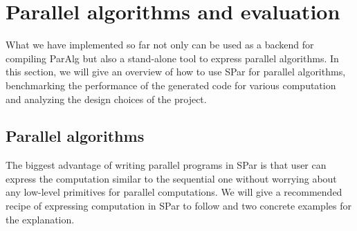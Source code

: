 

\chapter{Parallel algorithms and evaluation} \label{eval} \label{chap:eval}
What we have implemented so far not only can be used as a backend for compiling ParAlg but also a stand-alone tool to express parallel algorithms. In this section, we will give an overview of how to use SPar for parallel algorithms, benchmarking the performance of the generated code for various computation and analyzing the design choices of the project.
\section{Parallel algorithms}
The biggest advantage of writing parallel programs in SPar is that user can express the computation similar to the sequential one without worrying about any low-level primitives for parallel computations. We will give a recommended recipe of expressing computation in SPar to follow and two concrete examples for the explanation.

